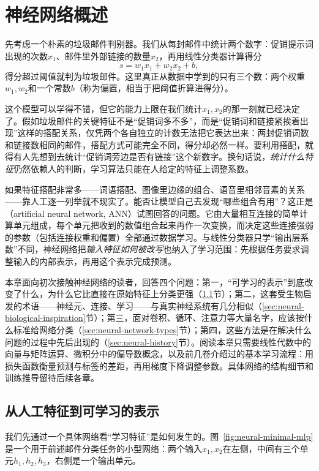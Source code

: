 \chapter{神经网络概述}
\label{chap:neural-network-overview}

先考虑一个朴素的垃圾邮件判别器。我们从每封邮件中统计两个数字：促销提示词出现的次数$x_1$、邮件里外部链接的数量$x_2$，再用线性分类器计算得分
\[
  s=w_1x_1+w_2x_2+b,
\]
得分超过阈值就判为垃圾邮件。这里真正从数据中学到的只有三个数：两个权重$w_1,w_2$和一个常数$b$（称为偏置，相当于把阈值折算进得分）。

这个模型可以学得不错，但它的能力上限在我们统计$x_1,x_2$的那一刻就已经决定了。假如垃圾邮件的关键特征不是“促销词多不多”，而是“促销词和链接紧挨着出现”这样的搭配关系，仅凭两个各自独立的计数无法把它表达出来：两封促销词数和链接数相同的邮件，搭配方式可能完全不同，得分却必然一样。要利用搭配，就得有人先想到去统计“促销词旁边是否有链接”这个新数字。换句话说，\emph{统计什么特征}仍然依赖人的判断，学习算法只能在人给定的特征上调整系数。

如果特征搭配非常多——词语搭配、图像里边缘的组合、语音里相邻音素的关系——靠人工逐一列举就不现实了。能否让模型自己去发现“哪些组合有用”？这正是（artificial neural network, ANN）试图回答的问题。它由大量相互连接的简单计算单元组成，每个单元把收到的数值组合起来再作一次变换，而决定这些连接强弱的参数（包括连接权重和偏置）全部通过数据学习。与线性分类器只学“输出层系数”不同，神经网络把\emph{输入特征如何被改写}也纳入了学习范围：先根据任务要求调整输入的内部表示，再用这个表示完成预测。

本章面向初次接触神经网络的读者，回答四个问题：第一，“可学习的表示”到底改变了什么，为什么它比直接在原始特征上分类更强（\ref{sec:neural-learned-representations}节）；第二，这套受生物启发的术语——神经元、连接、学习——与真实神经系统有几分相似（\ref{sec:neural-biological-inspiration}节）；第三，面对卷积、循环、注意力等大量名字，应该按什么标准给网络分类（\ref{sec:neural-network-types}节）；第四，这些方法是在解决什么问题的过程中先后出现的（\ref{sec:neural-history}节）。阅读本章只需要线性代数中的向量与矩阵运算、微积分中的偏导数概念，以及前几卷介绍过的基本学习流程：用损失函数衡量预测与标签的差距，再用梯度下降调整参数。具体网络的结构细节和训练推导留待后续各章。

\section{从人工特征到可学习的表示}
\label{sec:neural-learned-representations}

我们先通过一个具体网络看“学习特征”是如何发生的。图~\ref{fig:neural-minimal-mlp}是一个用于前述邮件分类任务的小型网络：两个输入$x_1,x_2$在左侧，中间有三个单元$h_1,h_2,h_3$，右侧是一个输出单元。

